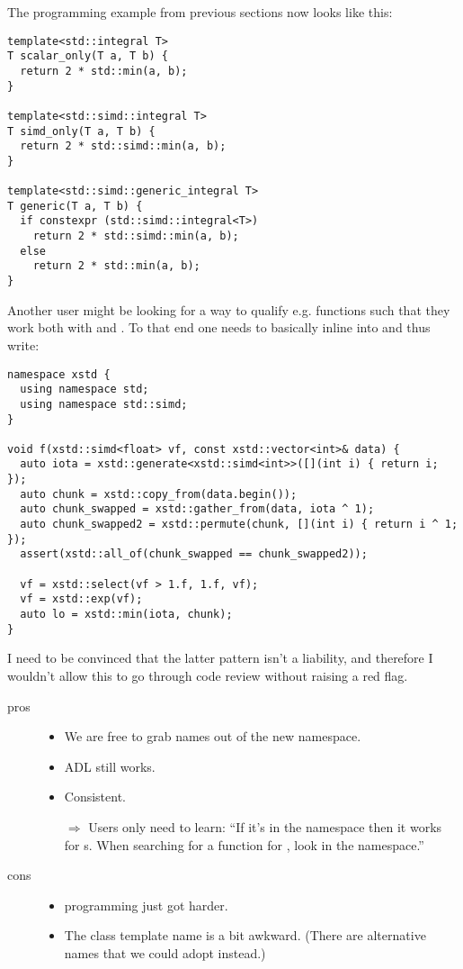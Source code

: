 The \simdgeneric programming example from previous sections now looks like
this:
\medskip\begin{lstlisting}[style=Vc]
template<std::integral T>
T scalar_only(T a, T b) {
  return 2 * std::min(a, b);
}

template<std::simd::integral T>
T simd_only(T a, T b) {
  return 2 * std::simd::min(a, b);
}

template<std::simd::generic_integral T>
T generic(T a, T b) {
  if constexpr (std::simd::integral<T>)
    return 2 * std::simd::min(a, b);
  else
    return 2 * std::min(a, b);
}
\end{lstlisting}

Another user might be looking for a way to qualify e.g. 
functions such that they work both with  and \simdT.
To that end one needs to basically inline \std{} into  and
thus write:
\medskip\begin{lstlisting}[style=Vc]
namespace xstd {
  using namespace std;
  using namespace std::simd;
}

void f(xstd::simd<float> vf, const xstd::vector<int>& data) {
  auto iota = xstd::generate<xstd::simd<int>>([](int i) { return i; });
  auto chunk = xstd::copy_from(data.begin());
  auto chunk_swapped = xstd::gather_from(data, iota ^ 1);
  auto chunk_swapped2 = xstd::permute(chunk, [](int i) { return i ^ 1; });
  assert(xstd::all_of(chunk_swapped == chunk_swapped2));

  vf = xstd::select(vf > 1.f, 1.f, vf);
  vf = xstd::exp(vf);
  auto lo = xstd::min(iota, chunk);
}
\end{lstlisting}

I need to be convinced that the latter pattern isn't a liability, and
therefore I wouldn't allow this to go through code review without raising a
red flag.

\begin{description}
  \item[pros]
    \begin{itemize}
      \item We are free to grab names out of the new namespace.
      \item ADL still works.
      \item Consistent.
      \item[$\Rightarrow$] Users only need to learn: “If it's in the
        \std{} namespace then it works for s.
        When searching for a function for , look in the
        \std{} namespace.”
    \end{itemize}

  \item[cons]
    \begin{itemize}
      \item \simdgeneric programming just got harder.
      \item The class template name \std{} is a bit awkward.
        (There are alternative names that we could adopt instead.)
    \end{itemize}
\end{description}

